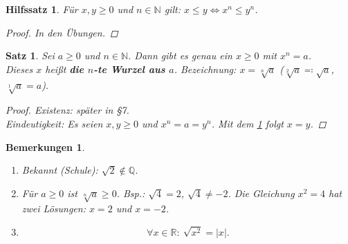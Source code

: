 \documentclass[12pt]{extreport} %
\newcommand{\N}{\mathbb{N}}
\newcommand{\Q}{\mathbb{Q}}
\newcommand{\R}{\mathbb{R}}
\theoremstyle{named}
\theoremstyle{itshape}
\newtheorem{satz}[unnamedtheorem]{Satz}
\newtheorem{hilfssatz}[unnamedtheorem]{Hilfssatz}
\theoremstyle{normal}
\newtheorem*{bemerkungen}{Bemerkungen}
\begin{document}
\begin{hilfssatz} \label{HS1}
	Für $x, y \geq 0$ und $n \in \N$ gilt: $x \leq y \iff x^{n} \leq y^{n}$.

	\begin{proof}
		In den Übungen.
	\end{proof}
\end{hilfssatz}

\begin{satz} \label{1.6:satz}
	Sei $a \geq 0$ und $n \in \N$. Dann gibt es genau ein $x \geq 0$ mit $x^{n} = a$. \\
	Dieses $x$ hei{\ss}t \textbf{die $n$-te Wurzel aus $a$}. Bezeichnung: $x = \sqrt[n]{a}$ ($\sqrt[2]{a} \eqqcolon \sqrt{a}$, $\sqrt[1]{a} = a$).
	
	\begin{proof}
		Existenz: später in \S 7. \\
		Eindeutigkeit: Es seien $x, y \geq 0$ und $x^{n} = a = y^{n}$. Mit dem \ref{HS1} folgt $x = y$.
	\end{proof}
\end{satz}


\begin{bemerkungen} \
	\begin{enumerate}
		\item Bekannt (Schule): $\sqrt{2} \notin \Q$.
		\item Für $a \geq 0$ ist $\sqrt[n]{a} \geq 0$. Bsp.: $\sqrt{4} = 2$, $\sqrt{4} \neq - 2$. Die Gleichung $x^{2} = 4$ hat zwei Lösungen: $x = 2$ und $x=-2$.
		\item $$\forall x \in \R: ~ \sqrt{x^{2}} = |x|.$$
	\end{enumerate}
\end{bemerkungen}
\end{document}
